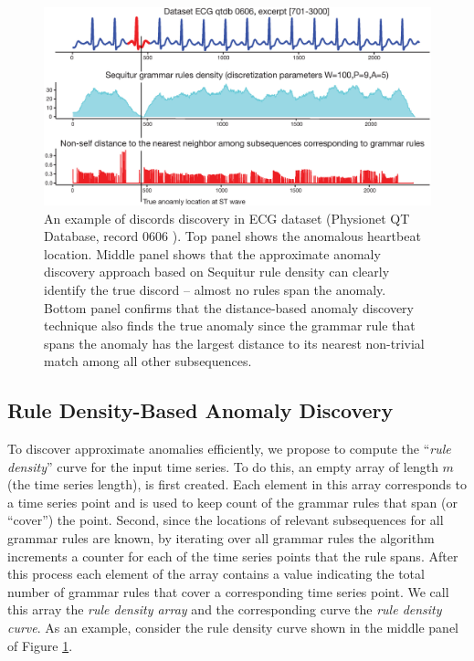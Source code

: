 \documentclass{llncs}
\begin{document}
\begin{figure}[t]
   \vspace{-0.2cm}
   \hspace{-0.3cm}  
   \includegraphics[width=122mm]{Figure2_ECG0606.ps}
   \caption{An example of discords discovery in ECG dataset (Physionet QT Database, record 0606 \cite{physionet}). Top panel shows the anomalous heartbeat location. Middle panel shows that the approximate anomaly discovery approach based on Sequitur rule density can clearly identify the true discord -- almost no rules span the anomaly. Bottom panel confirms that the distance-based anomaly discovery technique also finds the true anomaly since the grammar rule that spans the anomaly has the largest distance to its nearest non-trivial match among all other subsequences.}
   \label{fig:ecg}
   \vspace{-0.3cm}
\end{figure}

\subsection{Rule Density-Based Anomaly Discovery}
To discover approximate anomalies efficiently, we propose to compute the ``\textit{rule density}'' curve for the input time series. To do this, an empty array of length $m$ (the time series length), is first created. Each element in this array corresponds to a time series point and is used to keep count of the grammar rules that span (or ``cover'') the point. Second, since the locations of relevant subsequences for all grammar rules are known, by iterating over all grammar rules the algorithm increments a counter for each of the time series points that the rule spans. After this process each element of the array contains a value indicating the total number of grammar rules that cover a corresponding time series point. We call this array the \textit{rule density array} and the corresponding curve the \textit{rule density curve}. As an example, consider the rule density curve shown in the middle panel of Figure \ref{fig:ecg}.
\end{document}
